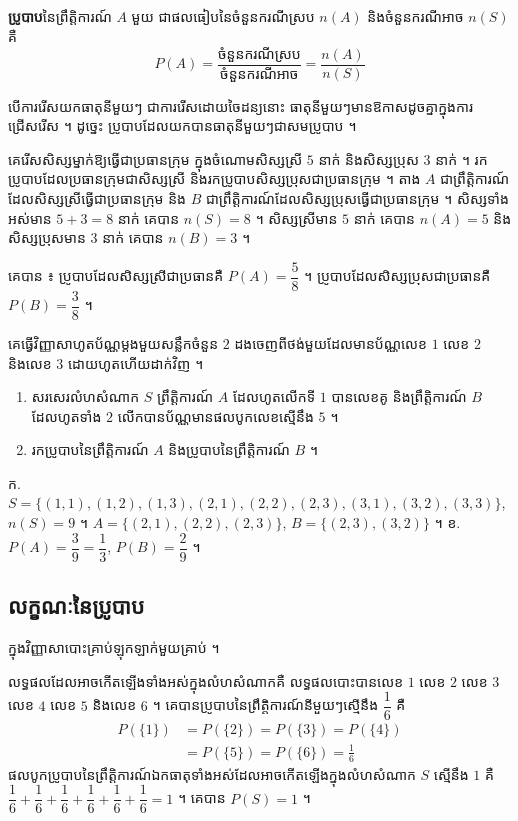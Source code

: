 \begin{definition}[និយមន័យ]
\textbf{ប្រូបាប}នៃព្រឹត្តិការណ៍ $A$ មួយ ជាផលធៀបនៃចំនួនករណីស្រប $n(A)$ និងចំនួនករណីអាច $n(S)$ គឺ
\[
P(A) = \frac{\text{ចំនួនករណីស្រប}}{\text{ចំនួនករណីអាច}} = \frac{n(A)}{n(S)}
\]
\end{definition}

\begin{note}[សម្គាល់]
បើការរើសយកធាតុនីមួយៗ ជាការរើសដោយចៃដន្យនោះ ធាតុនីមួយៗមានឱកាសដូចគ្នាក្នុងការជ្រើសរើស ។ ដូច្នេះ ប្រូបាបដែលយកបានធាតុនីមួយៗជាសមប្រូបាប ។
\end{note}

\begin{example}[លំហាត់គំរូ]
គេរើសសិស្សម្នាក់ឱ្យធ្វើជាប្រធានក្រុម ក្នុងចំណោមសិស្សស្រី $5$ នាក់ និងសិស្សប្រុស $3$ នាក់ ។ រកប្រូបាបដែលប្រធានក្រុមជាសិស្សស្រី និងរកប្រូបាបសិស្សប្រុសជាប្រធានក្រុម ។
\ans
តាង $A$ ជាព្រឹត្តិការណ៍ដែលសិស្សស្រីធ្វើជាប្រធានក្រុម និង $B$ ជាព្រឹត្តិការណ៍ដែលសិស្សប្រុសធ្វើជាប្រធានក្រុម ។ សិស្សទាំងអស់មាន $5 + 3 = 8$ នាក់ គេបាន $n(S) = 8$ ។ សិស្សស្រីមាន $5$ នាក់ គេបាន $n(A) = 5$ និងសិស្សប្រុសមាន $3$ នាក់ គេបាន $n(B) = 3$ ។

គេបាន ៖ ប្រូបាបដែលសិស្សស្រីជាប្រធានគឺ $P(A) = \dfrac{5}{8}$ ។ ប្រូបាបដែលសិស្សប្រុសជាប្រធានគឺ $P(B) = \dfrac{3}{8}$ ។
\end{example}

\begin{pro}
គេធ្វើវិញ្ញាសាហូតប័ណ្ណម្ដងមួយសន្លឹកចំនួន $2$ ដងចេញពីថង់មួយដែលមានប័ណ្ណលេខ $1$ លេខ $2$ និងលេខ $3$ ដោយហូតហើយដាក់វិញ ។
\begin{enumerate}[a]
  \item សរសេរលំហសំណាក $S$ ព្រឹត្តិការណ៍ $A$ ដែលហូតលើកទី $1$ បានលេខគូ និងព្រឹត្តិការណ៍ $B$ ដែលហូតទាំង $2$ លើកបានប័ណ្ណមានផលបូកលេខស្មើនឹង $5$ ។
  \item រកប្រូបាបនៃព្រឹត្តិការណ៍ $A$ និងប្រូបាបនៃព្រឹត្តិការណ៍ $B$ ។
\end{enumerate}
\ans
ក. $S = \{(1,1), (1,2), (1,3), (2,1), (2,2), (2,3), (3,1), (3,2), (3,3)\}$, $n(S) = 9$ ។ $A = \{(2,1), (2,2), (2,3)\}$, $B = \{(2,3), (3,2)\}$ ។ \quad ខ. $P(A) = \dfrac{3}{9} = \dfrac{1}{3}$, $P(B) = \dfrac{2}{9}$ ។
\end{pro}

\subsection{លក្ខណៈនៃប្រូបាប}

\begin{example}[ឧទាហរណ៍]
ក្នុងវិញ្ញាសាបោះគ្រាប់ឡុកឡាក់មួយគ្រាប់ ។
\end{example}
លទ្ធផលដែលអាចកើតឡើងទាំងអស់ក្នុងលំហសំណាកគឺ លទ្ធផលបោះបានលេខ $1$ លេខ $2$ លេខ $3$ លេខ $4$ លេខ $5$ និងលេខ $6$ ។ គេបានប្រូបាបនៃព្រឹត្តិការណ៍នីមួយៗស្មើនឹង $\dfrac{1}{6}$ គឺ
\[
\begin{aligned}
P(\{1\}) &= P(\{2\}) = P(\{3\}) = P(\{4\})\\
&= P(\{5\}) = P(\{6\}) = \frac{1}{6}
\end{aligned}
\]
ផលបូកប្រូបាបនៃព្រឹត្តិការណ៍ឯកធាតុទាំងអស់ដែលអាចកើតឡើងក្នុងលំហសំណាក $S$ ស្មើនឹង $1$ គឺ $\dfrac{1}{6} + \dfrac{1}{6} + \dfrac{1}{6} + \dfrac{1}{6} + \dfrac{1}{6} + \dfrac{1}{6} = 1$ ។ គេបាន $P(S) = 1$ ។

